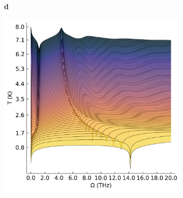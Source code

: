 \begin{figure}[h]
{\begin{subfigure}[b]{.58\textwidth}
\end{subfigure}%
\begin{subfigure}[t]{0.01\textwidth}
    \vspace*{-7.5cm}\textbf{d}
  \end{subfigure}%
\begin{subfigure}[b]{.58\textwidth}
\centering
\includegraphics[width=.87\textwidth]{chapters/frohlich/figures/conductivity_plot_temp_imag_6.pdf}
\end{subfigure}%
}
\end{figure}
